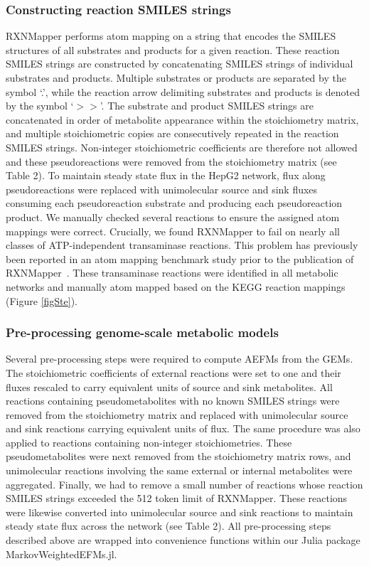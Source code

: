 \documentclass[12pt]{article}
\begin{document}
\subsubsection*{Constructing reaction SMILES strings}

RXNMapper performs atom mapping on a string that encodes the SMILES
structures of all substrates and products for a given reaction. These
reaction SMILES strings are constructed by concatenating SMILES strings of
individual substrates and products. Multiple substrates or products are
separated by the symbol `.', while the reaction arrow delimiting
substrates and products is denoted by the symbol `$>>$'. The substrate and
product SMILES strings are concatenated in order of metabolite appearance
within the stoichiometry matrix, and multiple stoichiometric copies are
consecutively repeated in the reaction SMILES strings. Non-integer
stoichiometric coefficients are therefore not allowed and these
pseudoreactions were removed from the stoichiometry matrix (see Table 2).
To maintain steady state flux in the HepG2 network, flux along
pseudoreactions were replaced with unimolecular source and sink fluxes
consuming each pseudoreaction substrate and producing each pseudoreaction
product. We manually checked several reactions to ensure the assigned atom
mappings were correct. Crucially, we found RXNMapper to fail on nearly all
classes of ATP-independent transaminase reactions. This problem has
previously been reported in an atom mapping benchmark study prior to the
publication of RXNMapper~\citep{PreciatGonzalezGermanA.2017Ceoa}. These
transaminase reactions were identified in all metabolic networks and
manually atom mapped based on the KEGG reaction mappings (Figure \ref{figSte}).

\subsubsection*{Pre-processing genome-scale metabolic models}

Several pre-processing steps were required to compute AEFMs from the GEMs.
The stoichiometric coefficients of external reactions were set to one and
their fluxes rescaled to carry equivalent units of source and sink
metabolites. All reactions containing pseudometabolites with no known
SMILES strings were removed from the stoichiometry matrix and replaced
with unimolecular source and sink reactions carrying equivalent units of
flux. The same procedure was also applied to reactions containing
non-integer stoichiometries. These pseudometabolites were next removed
from the stoichiometry matrix rows, and unimolecular reactions involving
the same external or internal metabolites were aggregated. Finally, we had
to remove a small number of reactions whose reaction SMILES strings
exceeded the 512 token limit of RXNMapper. These reactions were likewise
converted into unimolecular source and sink reactions to maintain steady
state flux across the network (see Table 2). All pre-processing steps
described above are wrapped into convenience functions within our Julia
package MarkovWeightedEFMs.jl.
\end{document}
